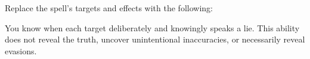 Replace the spell's targets and effects with the following:
\begin{spellcontent}

\begin{augmenttargetinginfo}




\end{augmenttargetinginfo}


\begin{augmenteffects}



\spelleffect
You know when each target deliberately and knowingly speaks a lie.
This ability does not reveal the truth, uncover unintentional inaccuracies, or necessarily reveal evasions.








\end{augmenteffects}

\end{spellcontent}








